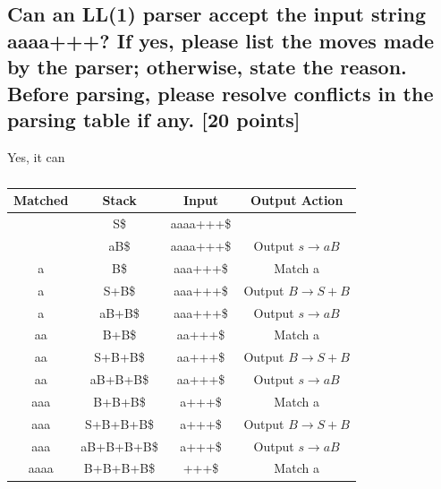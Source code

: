 \documentclass{article}
\begin{document}
        \subsection{Can an LL(1) parser accept the input string aaaa+++? If yes, please list the moves made by the parser; otherwise, state the reason. Before parsing, please resolve conflicts in the parsing table if any. [20 points]}
        Yes, it can
        \begin{table}[H]
            \centering
            \caption{}
            \label{tab:aStrangeTable}
            \begin{tabular}{|c|c|c|c|}
                \hline
                    Matched & Stack     & Input     & Output Action                 \\
                    \hline
                            & S\$         & aaaa+++\$   &                               \\
                    \hline
                            & aB\$        & aaaa+++\$   & Output $s\rightarrow aB$      \\
                    \hline
                    a       & B\$         & aaa+++\$    & Match a                       \\
                    \hline
                    a       & S+B\$       & aaa+++\$    & Output $B\rightarrow S+B$     \\
                    \hline
                    a       & aB+B\$      & aaa+++\$    & Output $s\rightarrow aB$      \\
                    \hline
                    aa      & B+B\$       & aa+++\$     & Match a                       \\
                    \hline
                    aa      & S+B+B\$     & aa+++\$     & Output $B\rightarrow S+B$     \\
                    \hline
                    aa      & aB+B+B\$    & aa+++\$     & Output $s\rightarrow aB$      \\
                    \hline
                    aaa     & B+B+B\$     & a+++\$      & Match a                       \\
                    \hline
                    aaa     & S+B+B+B\$   & a+++\$      & Output $B\rightarrow S+B$     \\
                    \hline
                    aaa     & aB+B+B+B\$  & a+++\$      & Output $s\rightarrow aB$      \\
                    \hline
                    aaaa    & B+B+B+B\$   & +++\$       & Match a                       \\

\end{tabular}
\end{table}
\end{document}
